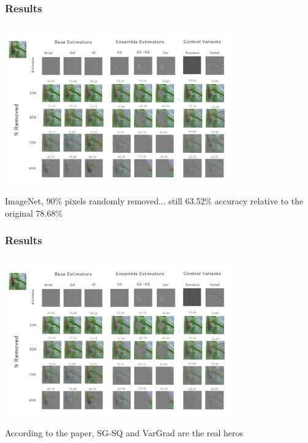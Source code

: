 \documentclass{beamer}
\theoremstyle{mystyle}
\begin{document}
\begin{frame}
	\frametitle{Results}
	\includegraphics[height=7.2cm, width=10cm]{ROAR_methods.png}\\
	ImageNet, 90\% pixels randomly removed... still 63.52\% accuracy relative to the original 78.68\% \pause
\end{frame}

\begin{frame}
	\frametitle{Results}
	\includegraphics[height=7.2cm, width=10cm]{ROAR_methods.png}\\

	According to the paper, SG-SQ and VarGrad are the real heros 
\end{frame}
\end{document}
